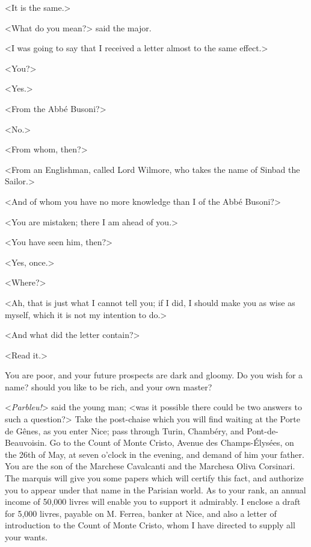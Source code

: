  <It is the same.> 

 <What do you mean?> said the major. 

 <I was going to say that I received a letter almost to the same effect.> 

 <You?> 

 <Yes.> 

 <From the Abbé Busoni?> 

 <No.> 

 <From whom, then?> 

 <From an Englishman, called Lord Wilmore, who takes the name of Sinbad the Sailor.> 

 <And of whom you have no more knowledge than I of the Abbé Busoni?> 

 <You are mistaken; there I am ahead of you.> 

 <You have seen him, then?> 

 <Yes, once.> 

 <Where?> 

 <Ah, that is just what I cannot tell you; if I did, I should make you as wise as myself, which it is not my intention to do.> 

 <And what did the letter contain?> 

 <Read it.> 
 
 \begin{mail}{}{}
You are poor, and your future prospects are dark and gloomy. Do you wish for a name? should you like to be rich, and your own master?

\pausemail
 <\textit{Parbleu!}> said the young man; <was it possible there could be two answers to such a question?>  
 \resumemail
Take the post-chaise which you will find waiting at the Porte de Gênes, as you enter Nice; pass through Turin, Chambéry, and Pont-de-Beauvoisin. Go to the Count of Monte Cristo, Avenue des Champs-Élysées, on the 26th of May, at seven o'clock in the evening, and demand of him your father. You are the son of the Marchese Cavalcanti and the Marchesa Oliva Corsinari. The marquis will give you some papers which will certify this fact, and authorize you to appear under that name in the Parisian world. As to your rank, an annual income of 50,000 livres will enable you to support it admirably. I enclose a draft for 5,000 livres, payable on M. Ferrea, banker at Nice, and also a letter of introduction to the Count of Monte Cristo, whom I have directed to supply all your wants. 

\end{mail}

